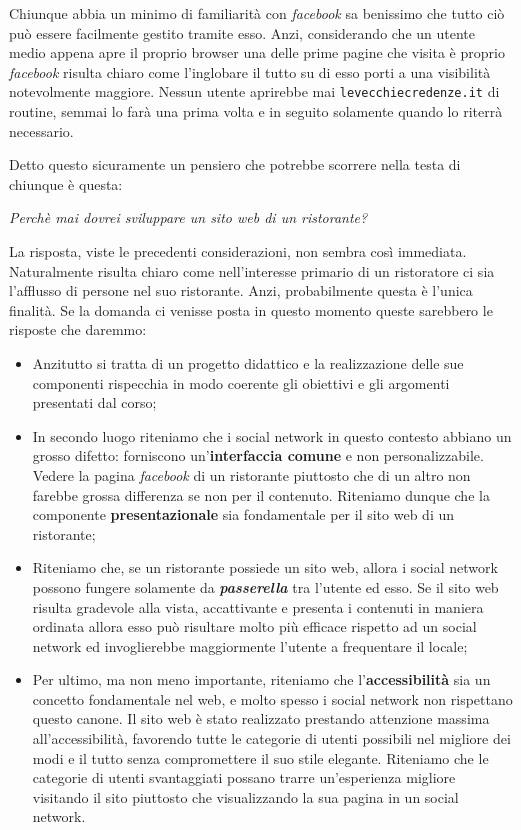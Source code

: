 Chiunque abbia un minimo di familiarità con \textit{facebook} sa benissimo che tutto ciò può essere facilmente gestito tramite esso. Anzi, considerando che un utente medio appena apre il proprio browser una delle prime pagine che visita è proprio \textit{facebook} risulta chiaro come l'inglobare il tutto su di esso porti a una visibilità notevolmente maggiore. Nessun utente aprirebbe mai \texttt{levecchiecredenze.it} di routine, semmai lo farà una prima volta e in seguito solamente quando lo riterrà necessario.

Detto questo sicuramente un pensiero che potrebbe scorrere nella testa di chiunque è questa:

\begin{center}

\textit{Perchè mai dovrei sviluppare un sito web di un ristorante?}

\end{center}
La risposta, viste le precedenti considerazioni, non sembra così immediata. Naturalmente risulta chiaro come nell'interesse primario di un ristoratore ci sia l'afflusso di persone nel suo ristorante. Anzi, probabilmente questa è l'unica finalità. Se la domanda ci venisse posta in questo momento queste sarebbero le risposte che daremmo:

\begin{itemize}

	\item Anzitutto si tratta di un progetto didattico e la realizzazione delle sue componenti rispecchia in modo coerente gli obiettivi e gli argomenti presentati dal corso;
	\item In secondo luogo riteniamo che i social network in questo contesto abbiano un grosso difetto: forniscono un'\textbf{interfaccia comune} e non personalizzabile. Vedere la pagina \textit{facebook} di un ristorante piuttosto che di un altro non farebbe grossa differenza se non per il contenuto. Riteniamo dunque che la componente \textbf{presentazionale} sia fondamentale per il sito web di un ristorante;
	\item Riteniamo che, se un ristorante possiede un sito web, allora i social network possono fungere solamente da \textbf{\textit{passerella}} tra l'utente ed esso. Se il sito web risulta gradevole alla vista, accattivante e presenta i contenuti in maniera ordinata allora esso può risultare molto più efficace rispetto ad un social network ed invoglierebbe maggiormente l'utente a frequentare il locale;
	\item Per ultimo, ma non meno importante, riteniamo che l'\textbf{accessibilità} sia un concetto fondamentale nel web, e molto spesso i social network non rispettano questo canone. Il sito web è stato realizzato prestando attenzione massima all'accessibilità, favorendo tutte le categorie di utenti possibili nel migliore dei modi e il tutto senza compromettere il suo stile elegante. Riteniamo che le categorie di utenti svantaggiati possano trarre un'esperienza migliore visitando il sito piuttosto che visualizzando la sua pagina in un social network.
	
\end{itemize}

